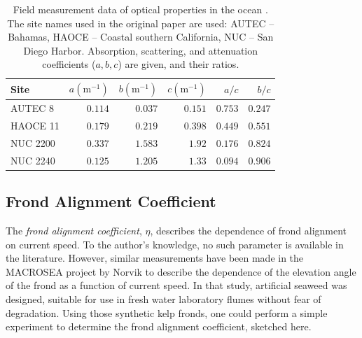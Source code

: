 \documentclass[ms,cpyr,lof,lot]{uathesis}
\begin{document}
\begin{table}
  \centering
  \caption{Field measurement data of optical properties in the ocean \cite{petzold_volume_1972}.
    The site names used in the original paper are used: AUTEC -- Bahamas, HAOCE -- Coastal southern California, NUC -- San Diego Harbor.
    Absorption, scattering, and attenuation coefficients ($a,b,c$) are given, and their ratios.
  }
  \begin{tabular}{lrrrrr}
    \toprule
    Site & $a (\mbox{m}^{-1})$ & $b (\mbox{m}^{-1})$ & $c(\mbox{m}^{-1} )$ & $a/c$ & $b/c$ \\
    \midrule
    AUTEC 8 & $0.114$ & $0.037$ & $0.151$ & $0.753$ & $0.247$ \\
    HAOCE 11 & $0.179$ & $0.219$ & $0.398$ & $0.449$ & $0.551$ \\
    NUC 2200 & $0.337$ & $1.583$ & $1.92$ & $0.176$ & $0.824$ \\
    NUC 2240 & $0.125$ & $1.205$ & $1.33$ & $0.094$ & $0.906$ \\
    \bottomrule
  \end{tabular}
  \label{tab:petzold}
\end{table}

\subsection{Frond Alignment Coefficient}
The \textit{frond alignment coefficient}, $\eta$, describes the dependence of frond alignment on current speed.
To the author's knowledge, no such parameter is available in the literature.
However, similar measurements have been made in the MACROSEA project by Norvik \cite{norvik_design_2017} to describe
the dependence of the elevation angle of the frond as a function of current speed.
In that study, artificial seaweed was designed, suitable for use in fresh water laboratory flumes without fear of degradation.
Using those synthetic kelp fronds, one could perform a simple experiment to determine the frond alignment coefficient, sketched here.
\end{document}
